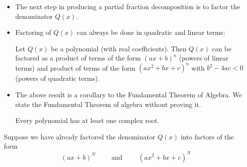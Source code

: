 \begin{frame}
\begin{itemize}
\item The next step in producing a partial fraction decomposition is to factor the denominator $Q(x)$.
\item Factoring of $Q(x)$ can always be done in quadratic and linear terms: 
\begin{corollary} 
Let $Q(x)$ be a polynomial (with real coefficients). Then $Q(x)$ can be factored as a product of terms of the form $(ax+b)^n$ (powers of linear terms) and product of terms of the form $(ax^2+bx+c)^n$ with $b^2-4ac<0$ (powers of quadratic terms).
\end{corollary}  
\item The above result is a corollary to the Fundamental Theorem of Algebra. We state the Fundamental Theorem of algebra without proving it.
\begin{theorem}
Every polynomial has at least one complex root.
\end{theorem}
\end{itemize}
\end{frame}

\begin{frame}
Suppose we have already factored the denominator $Q(x)$ into factors of the form 
\[
(ax+b)^N\qquad \text{ and }\qquad (ax^2+bx+c)^N
\]

\end{frame}
